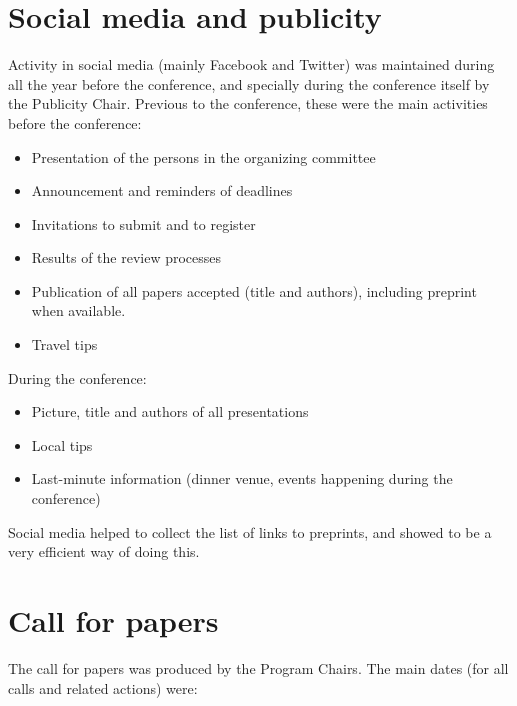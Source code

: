 \documentclass[a4paper]{report}
\begin{document}
\section{Social media and publicity}

Activity in social media (mainly Facebook and Twitter) was maintained during all the year before the conference, and specially during the conference itself by the Publicity Chair. Previous to the conference, these were the main activities before the conference:

\begin{itemize}
\item Presentation of the persons in the organizing committee
\item Announcement and reminders of deadlines
\item Invitations to submit and to register
\item Results of the review processes
\item Publication of all papers accepted (title and authors),
  including preprint when available.
\item Travel tips
\end{itemize}

During the conference:

\begin{itemize}
\item Picture, title and authors of all presentations
\item Local tips
\item Last-minute information (dinner venue, events happening during the conference)
\end{itemize}

Social media helped to collect the list of links to preprints, and showed to be a very efficient way of doing this.

\section{Call for papers}

The call for papers was produced by the Program Chairs. The main dates (for all calls and related actions) were:
\end{document}

